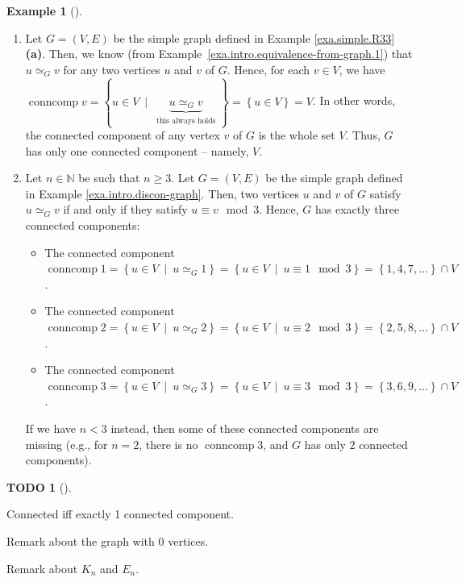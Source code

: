 \documentclass[numbers=enddot,12pt,final,onecolumn,notitlepage]{scrartcl}%
\theoremstyle{definition}
\newtheorem{exam}[theo]{Example}
\newenvironment{example}[1][]
{\begin{exam}[#1]\begin{leftbar}}
{\end{leftbar}\end{exam}}
\newtheorem{quest}[theo]{TODO}
\newenvironment{todo}[1][]
{\begin{quest}[#1]\begin{leftbar}}
{\end{leftbar}\end{quest}}
\newcommand{\conncomp}{\operatorname{conncomp}}
\newcommand{\NN}{\mathbb{N}}
\newcommand{\set}[1]{\left\{ #1 \right\}}
\newcommand{\tup}[1]{\left( #1 \right)}
\newcommand{\underbrack}[2]{\underbrace{#1}_{\substack{#2}}}
\begin{document}
\begin{example}

\begin{enumerate}

\item[\textbf{(a)}] Let $G = \tup{V, E}$ be the simple graph defined
in Example \ref{exa.simple.R33} \textbf{(a)}.
Then, we know (from Example~\ref{exa.intro.equivalence-from-graph.1})
that $u \simeq_G v$ for any two vertices $u$ and $v$ of $G$.
Hence, for each $v \in V$, we have
$\conncomp v
= \set{ u \in V \ \mid \  \underbrack{u \simeq_G v}
                                     {\text{this always holds}} }
= \set{ u \in V } = V$.
In other words, the connected component of any vertex $v$
of $G$ is the whole set $V$.
Thus, $G$ has only one connected component -- namely, $V$.

\item[\textbf{(b)}] Let $n \in \NN$ be such that $n \geq 3$.
Let $G = \tup{V, E}$ be the simple graph defined in
Example \ref{exa.intro.discon-graph}.
Then, two vertices $u$ and $v$ of $G$ satisfy
$u \simeq_G v$ if and only if they satisfy
$u \equiv v \mod 3$.
Hence, $G$ has exactly three connected components:
\begin{itemize}
\item The connected component
      $\conncomp 1
       = \set{ u \in V \ \mid \  u \simeq_G 1 }
       = \set{ u \in V \ \mid \  u \equiv 1 \mod 3 }
       = \set{1, 4, 7, \ldots} \cap V$.
\item The connected component
      $\conncomp 2
       = \set{ u \in V \ \mid \  u \simeq_G 2 }
       = \set{ u \in V \ \mid \  u \equiv 2 \mod 3 }
       = \set{2, 5, 8, \ldots} \cap V$.
\item The connected component
      $\conncomp 3
       = \set{ u \in V \ \mid \  u \simeq_G 3 }
       = \set{ u \in V \ \mid \  u \equiv 3 \mod 3 }
       = \set{3, 6, 9, \ldots} \cap V$.
\end{itemize}
If we have $n < 3$ instead, then some of these
connected components are missing (e.g., for $n = 2$,
there is no $\conncomp 3$, and $G$ has only $2$
connected components).

\end{enumerate}

\end{example}

\begin{todo}
Connected iff exactly 1 connected component.

Remark about the graph with $0$ vertices.

Remark about $K_n$ and $E_n$.
\end{todo}
\end{document}
